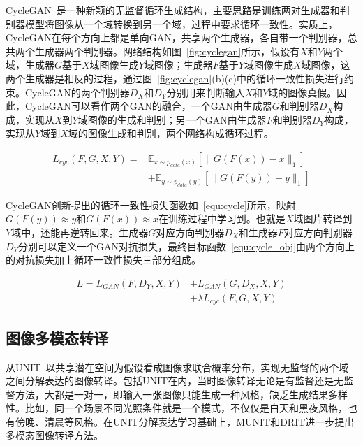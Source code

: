 CycleGAN~\cite{zhu2017unpaired}是一种新颖的无监督循环生成结构，主要思路是训练两对生成器和判别器模型将图像从一个域转换到另一个域，过程中要求循环一致性。实质上，CycleGAN在每个方向上都是单向GAN，共享两个生成器，各自带一个判别器，总共两个生成器两个判别器。网络结构如图~\ref{fig:cyclegan}所示，假设有$X$和$Y$两个域，生成器$G$基于$X$域图像生成$Y$域图像；生成器$F$基于$Y$域图像生成$X$域图像，这两个生成器是相反的过程，通过图~\ref{fig:cyclegan}(b)(c)中的循环一致性损失进行约束。CycleGAN的两个判别器$D_X$和$D_Y$分别用来判断输入$X$和$Y$域的图像真假。因此，CycleGAN可以看作两个GAN的融合，一个GAN由生成器$G$和判别器$D_X$构成，实现从$X$到$Y$域图像的生成和判别；另一个GAN由生成器$F$和判别器$D_Y$构成，实现从$Y$域到$X$域的图像生成和判别，两个网络构成循环过程。

\begin{equation}
\label{equ:cycle}
\begin{aligned}
L_{cyc}(F,G,X,Y)= & \mathbb{E}_{x \sim p_{data}(x)}[\parallel G(F(x))-x \parallel_1]\\
& + \mathbb{E}_{y \sim p_{data}(y)}[\parallel G(F(y))-y \parallel_1]
\end{aligned}
\end{equation}

CycleGAN创新提出的循环一致性损失函数如~\ref{equ:cycle}所示，映射$ G(F(y)) \approx y$和$ G(F(x)) \approx x$在训练过程中学习到。也就是$X$域图片转译到$Y$域中，还能再逆转回来。生成器$G$对应方向判别器$D_X$和生成器$F$对应方向判别器$D_Y$分别可以定义一个GAN对抗损失，最终目标函数~\ref{equ:cycle_obj}由两个方向上的对抗损失加上循环一致性损失三部分组成。    

\begin{equation}
\label{equ:cycle_obj}
\begin{aligned}
L=L_{GAN}(F,D_Y,X,Y)&+L_{GAN}(G,D_X,X,Y)\\
& + \lambda L_{cyc}(F,G,X,Y)
\end{aligned}
\end{equation}


\subsection{图像多模态转译}
从UNIT~\cite{liu2017unsupervised}以共享潜在空间为假设看成图像求联合概率分布，实现无监督的两个域之间分解表达的图像转译。包括UNIT在内，当时图像转译无论是有监督还是无监督方法，大都是一对一，即输入一张图像只能生成一种风格，缺乏生成结果多样性。比如，同一个场景不同光照条件就是一个模式，不仅仅是白天和黑夜风格，也有傍晚、清晨等风格。在UNIT分解表达学习基础上，MUNIT和DRIT进一步提出多模态图像转译方法。

